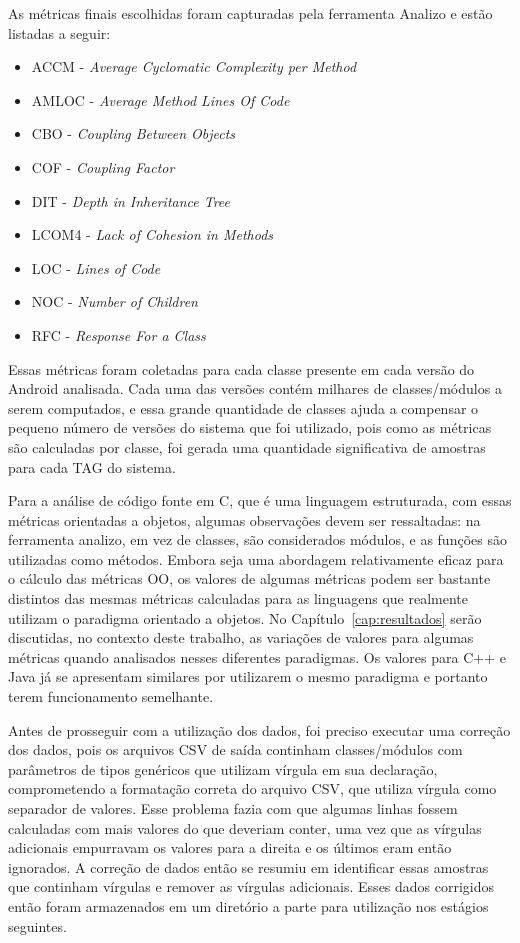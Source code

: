 As métricas finais escolhidas foram capturadas pela ferramenta Analizo e estão listadas a seguir:

\begin{itemize}
\item ACCM - \textit{Average Cyclomatic Complexity per Method}
\item AMLOC - \textit{Average Method Lines Of Code}
\item CBO - \textit{Coupling Between Objects}
\item COF - \textit{Coupling Factor}
\item DIT - \textit{Depth in Inheritance Tree}
\item LCOM4 - \textit{Lack of Cohesion in Methods}
\item LOC - \textit{Lines of Code}
\item NOC - \textit{Number of Children}
\item RFC - \textit{Response For a Class}
\end{itemize}


Essas métricas foram coletadas para cada classe presente em cada versão do Android analisada. Cada uma das versões contém milhares de classes/módulos a serem computados, e essa grande quantidade de classes ajuda a compensar o pequeno número de versões do sistema que foi utilizado, pois como as métricas são calculadas por classe, foi gerada uma quantidade significativa de amostras para cada TAG do sistema.

Para a análise de código fonte em C, que é uma linguagem estruturada, com essas métricas orientadas a objetos, algumas observações devem ser ressaltadas: na ferramenta analizo, em vez de classes, são considerados módulos, e as funções são utilizadas como métodos\cite{meirelles2013}. Embora seja uma abordagem relativamente eficaz para o cálculo das métricas OO, os valores de algumas métricas podem ser bastante distintos das mesmas métricas calculadas para as linguagens que realmente utilizam o paradigma orientado a objetos. No Capítulo~\ref{cap:resultados} serão discutidas, no contexto deste trabalho, as variações de valores para algumas métricas quando analisados nesses diferentes paradigmas. Os valores para C++ e Java já se apresentam similares por utilizarem o mesmo paradigma e portanto terem funcionamento semelhante.

Antes de prosseguir com a utilização dos dados, foi preciso executar uma correção dos dados, pois os arquivos CSV de saída continham classes/módulos com parâmetros de tipos genéricos que utilizam vírgula em sua declaração, comprometendo a formatação correta do arquivo CSV, que utiliza vírgula como separador de valores. Esse problema fazia com que algumas linhas fossem calculadas com mais valores do que deveriam conter, uma vez que as vírgulas adicionais empurravam os valores para a direita e os últimos eram então ignorados. A correção de dados então se resumiu em identificar essas amostras que continham vírgulas e remover as vírgulas adicionais. Esses dados corrigidos então foram armazenados em um diretório a parte para utilização nos estágios seguintes.

